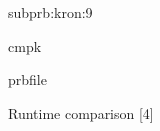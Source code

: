 \begin{samproblem}
\begin{subproblem}{subprb:kron:9}
\begin{samwriteprbpart}{cmpk}
  \begin{writeverbatim}{prbfile}
    \begin{samsolution}
      \begin{samcode}[C++11-code]{}{Runtime comparison}
        [4]
      \end{samcode}

    \end{samsolution}
  \end{writeverbatim}
\end{samwriteprbpart}
\end{subproblem}

\end{samproblem}
